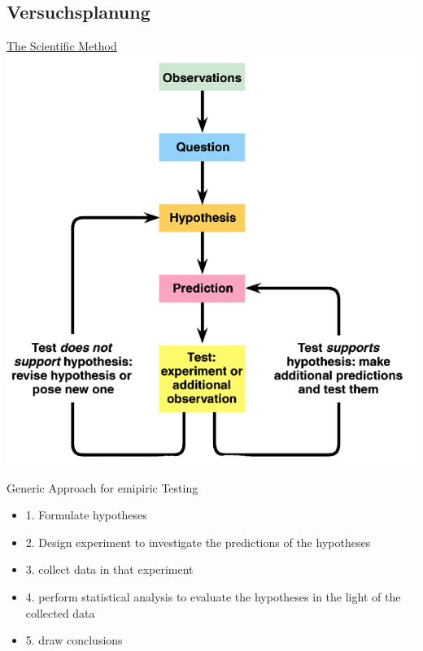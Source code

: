 \documentclass[a4paper,10pt,oneside]{article}
\begin{document}
\subsection{Versuchsplanung}
\underline{The Scientific Method} \\
 	\includegraphics[scale=0.2]{Grafiken/2518.png}

Generic Approach for emipiric Testing
	\begin{itemize}
		\item 1. Formulate hypotheses
		\item 2. Design experiment to investigate the predictions of the hypotheses
		\item 3. collect data in that experiment
		\item 4. perform statistical analysis to evaluate the hypotheses in the light of the collected data
		\item 5. draw conclusions
	\end{itemize}
	
\end{document}
